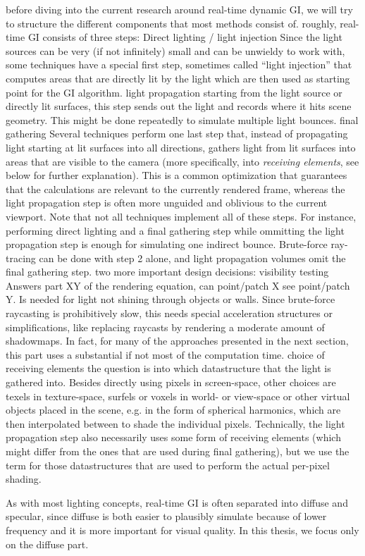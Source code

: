 \begin{outline}
\1 before diving into the current research around real-time dynamic GI, we will try to structure the different components that most methods consist of.
\1 roughly, real-time GI consists of three steps:
    \2 Direct lighting / light injection
        \3 Since the light sources can be very (if not infinitely) small and can be unwieldy to work with, some techniques have a special first step, sometimes called ``light injection'' that computes areas that are directly lit by the light which are then used as starting point for the GI algorithm.
    \2 light propagation
        \3 starting from the light source or directly lit surfaces, this step sends out the light and records where it hits scene geometry. This might be done repeatedly to simulate multiple light bounces.
    \2 final gathering
        \3 Several techniques perform one last step that, instead of propagating light starting at lit surfaces into all directions, gathers light from lit surfaces into areas that are visible to the camera (more specifically, into \textit{receiving elements}, see below for further explanation). This is a common optimization that guarantees that the calculations are relevant to the currently rendered frame, whereas the light propagation step is often more unguided and oblivious to the current viewport.
\1 Note that not all techniques implement all of these steps. For instance, performing direct lighting and a final gathering step while ommitting the light propagation step is enough for simulating one indirect bounce. Brute-force ray-tracing can be done with step 2 alone, and light propagation volumes omit the final gathering step.
\1 two more important design decisions:
    \2 visibility testing
        \3 Answers part XY of the rendering equation, can point/patch X see point/patch Y. Is needed for light not shining through objects or walls. Since brute-force raycasting is prohibitively slow, this needs special acceleration structures or simplifications, like replacing raycasts by rendering a moderate amount of shadowmaps. In fact, for many of the approaches presented in the next section, this part uses a substantial if not most of the computation time.
    \2 choice of receiving elements
        \3 the question is into which datastructure that the light is gathered into. Besides directly using pixels in screen-space, other choices are texels in texture-space, surfels or voxels in world- or view-space or other virtual objects placed in the scene, e.g. in the form of spherical harmonics, which are then interpolated between to shade the individual pixels. Technically, the light propagation step also necessarily uses some form of receiving elements (which might differ from the ones that are used during final gathering), but we use the term for those datastructures that are used to perform the actual per-pixel shading.

\1 As with most lighting concepts, real-time GI is often separated into diffuse and specular, since diffuse is both easier to plausibly simulate because of lower frequency and it is more important for visual quality.
\1 In this thesis, we focus only on the diffuse part.

\end{outline}



